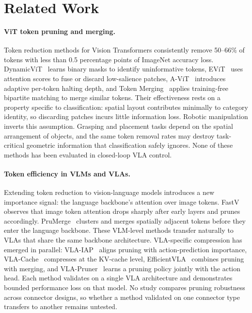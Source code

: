 \section{Related Work}
\label{sec:related_work}

\paragraph{ViT token pruning and merging.}
Token reduction methods for Vision Transformers consistently remove 50--66\% of tokens with less than 0.5 percentage points of ImageNet accuracy loss.
DynamicViT~\cite{rao2021dynamicvit} learns binary masks to identify uninformative tokens,
EViT~\cite{liang2022evit} uses attention scores to fuse or discard low-salience patches,
A-ViT~\cite{yin2022avit} introduces adaptive per-token halting depth,
and Token Merging~\cite{bolya2023tome} applies training-free bipartite matching to merge similar tokens.
Their effectiveness rests on a property specific to classification: spatial layout contributes minimally to category identity, so discarding patches incurs little information loss.
Robotic manipulation inverts this assumption.
Grasping and placement tasks depend on the spatial arrangement of objects, and the same token removal rates may destroy task-critical geometric information that classification safely ignores.
None of these methods has been evaluated in closed-loop VLA control.

\paragraph{Token efficiency in VLMs and VLAs.}
Extending token reduction to vision-language models introduces a new importance signal: the language backbone's attention over image tokens.
FastV~\cite{chen2024fastv} observes that image token attention drops sharply after early layers and prunes accordingly.
PruMerge~\cite{shang2024prumerge} clusters and merges spatially adjacent tokens before they enter the language backbone.
These VLM-level methods transfer naturally to VLAs that share the same backbone architecture.
VLA-specific compression has emerged in parallel:
VLA-IAP~\cite{wang2026vlaiap} aligns pruning with action-prediction importance,
VLA-Cache~\cite{hsu2025vlacache} compresses at the KV-cache level,
EfficientVLA~\cite{yang2025efficientvla} combines pruning with merging,
and VLA-Pruner~\cite{liu2025vlapruner} learns a pruning policy jointly with the action head.
Each method validates on a single VLA architecture and demonstrates bounded performance loss on that model.
No study compares pruning robustness across connector designs, so whether a method validated on one connector type transfers to another remains untested.

